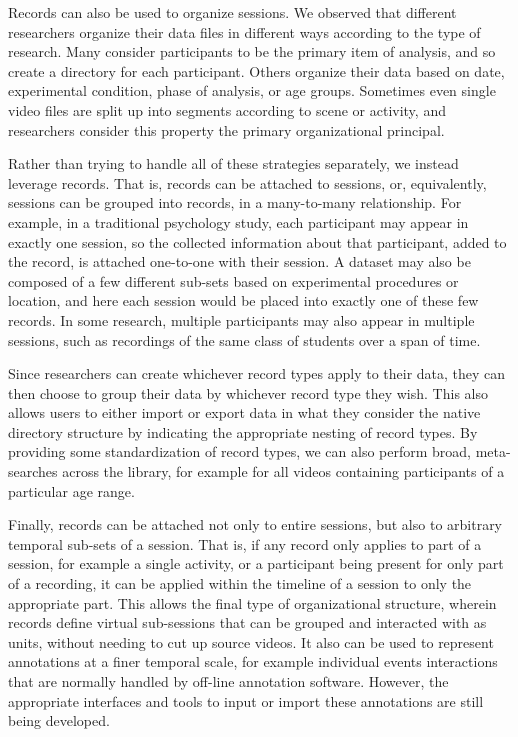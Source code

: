 \documentclass{sig-alternate}
\begin{document}
Records can also be used to organize sessions.
We observed that different researchers organize their data files in different ways according to the type of research.
Many consider participants to be the primary item of analysis, and so create a directory for each participant.
Others organize their data based on date, experimental condition, phase of analysis, or age groups.
Sometimes even single video files are split up into segments according to scene or activity, and researchers consider this property the primary organizational principal.

Rather than trying to handle all of these strategies separately, we instead leverage records.
That is, records can be attached to sessions, or, equivalently, sessions can be grouped into records, in a many-to-many relationship.
For example, in a traditional psychology study, each participant may appear in exactly one session, so the collected information about that participant, added to the record, is attached one-to-one with their session.
A dataset may also be composed of a few different sub-sets based on experimental procedures or location, and here each session would be placed into exactly one of these few records.
In some research, multiple participants may also appear in multiple sessions, such as recordings of the same class of students over a span of time.

Since researchers can create whichever record types apply to their data, they can then choose to group their data by whichever record type they wish.
This also allows users to either import or export data in what they consider the native directory structure by indicating the appropriate nesting of record types.
By providing some standardization of record types, we can also perform broad, meta-searches across the library, for example for all videos containing participants of a particular age range.

Finally, records can be attached not only to entire sessions, but also to arbitrary temporal sub-sets of a session.
That is, if any record only applies to part of a session, for example a single activity, or a participant being present for only part of a recording, it can be applied within the timeline of a session to only the appropriate part.
This allows the final type of organizational structure, wherein records define virtual sub-sessions that can be grouped and interacted with as units, without needing to cut up source videos.
It also can be used to represent annotations at a finer temporal scale, for example individual events interactions that are normally handled by off-line annotation software.
However, the appropriate interfaces and tools to input or import these annotations are still being developed.
\end{document}
